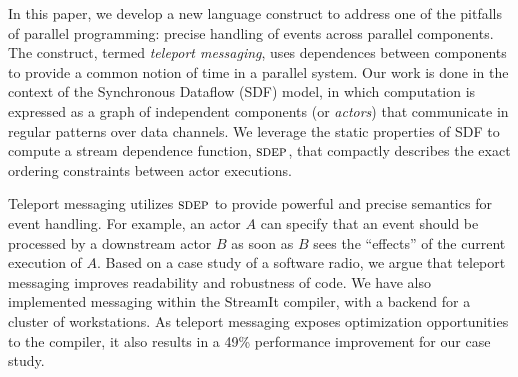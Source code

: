 In this paper, we develop a new language construct to address one of
the pitfalls of parallel programming: precise handling of events
across parallel components.  The construct, termed {\it teleport
messaging}, uses dependences between components to provide a common
notion of time in a parallel system.  Our work is done in the context
of the Synchronous Dataflow (SDF) model, in which computation is
expressed as a graph of independent components (or {\it actors}) that
communicate in regular patterns over data channels.  We leverage the
static properties of SDF to compute a stream dependence function,
$\textsc{sdep}$, that compactly describes the exact ordering constraints
between actor executions.

Teleport messaging utilizes $\textsc{sdep}$ to provide powerful and precise
semantics for event handling.  For example, an actor $A$ can specify
that an event should be processed by a downstream actor $B$ as soon as
$B$ sees the ``effects'' of the current execution of $A$.  Based on a
case study of a software radio, we argue that teleport messaging
improves readability and robustness of code.  We have also implemented
messaging within the StreamIt compiler, with a backend for a cluster
of workstations.  As teleport messaging exposes optimization
opportunities to the compiler, it also results in a 49\% performance
improvement for our case study.
